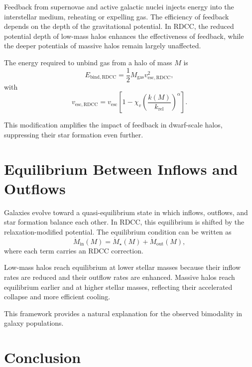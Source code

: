 \documentclass[11pt,a4paper]{article}
\begin{document}
Feedback from supernovae and active galactic nuclei injects energy into the 
interstellar medium, reheating or expelling gas. The efficiency of feedback 
depends on the depth of the gravitational potential. In RDCC, the reduced 
potential depth of low-mass halos enhances the effectiveness of feedback, while 
the deeper potentials of massive halos remain largely unaffected.

The energy required to unbind gas from a halo of mass $M$ is
\begin{equation}
    E_{\mathrm{bind,RDCC}}
    = \frac{1}{2} M_{\mathrm{gas}} v_{\mathrm{esc,RDCC}}^{2},
\end{equation}
with
\begin{equation}
    v_{\mathrm{esc,RDCC}}
    = v_{\mathrm{esc}}
      \left[1 - \chi_{v}
      \left(\frac{k(M)}{k_{\mathrm{rel}}}\right)^{\alpha}\right].
\end{equation}

This modification amplifies the impact of feedback in dwarf-scale halos, 
suppressing their star formation even further.
\section{Equilibrium Between Inflows and Outflows}

Galaxies evolve toward a quasi-equilibrium state in which inflows, outflows, and 
star formation balance each other. In RDCC, this equilibrium is shifted by the 
relaxation-modified potential. The equilibrium condition can be written as
\begin{equation}
    \dot{M}_{\mathrm{in}}(M)
    = \dot{M}_{\star}(M)
      + \dot{M}_{\mathrm{out}}(M),
\end{equation}
where each term carries an RDCC correction.

Low-mass halos reach equilibrium at lower stellar masses because their inflow 
rates are reduced and their outflow rates are enhanced. Massive halos reach 
equilibrium earlier and at higher stellar masses, reflecting their accelerated 
collapse and more efficient cooling.

This framework provides a natural explanation for the observed bimodality in 
galaxy populations.
\section{Conclusion}
\end{document}
